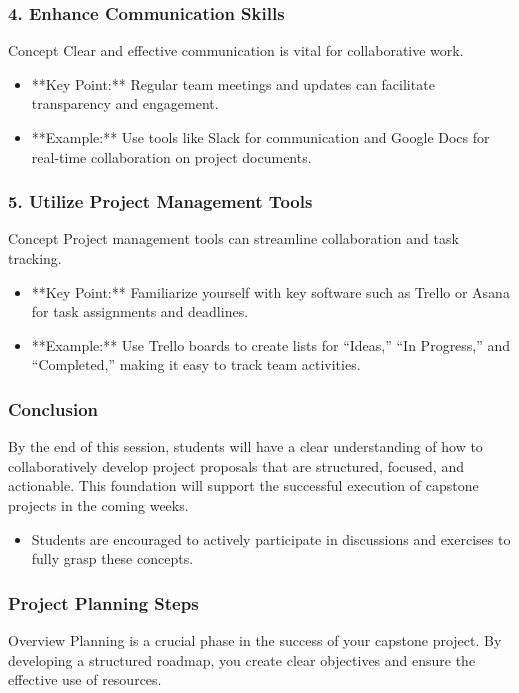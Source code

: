 \documentclass[aspectratio=169]{beamer}
\begin{document}
\begin{frame}[fragile]
    \frametitle{4. Enhance Communication Skills}
    \begin{block}{Concept}
        Clear and effective communication is vital for collaborative work.
    \end{block}
    \begin{itemize}
        \item **Key Point:** Regular team meetings and updates can facilitate transparency and engagement.
        \item **Example:** Use tools like Slack for communication and Google Docs for real-time collaboration on project documents.
    \end{itemize}
\end{frame}

\begin{frame}[fragile]
    \frametitle{5. Utilize Project Management Tools}
    \begin{block}{Concept}
        Project management tools can streamline collaboration and task tracking.
    \end{block}
    \begin{itemize}
        \item **Key Point:** Familiarize yourself with key software such as Trello or Asana for task assignments and deadlines.
        \item **Example:** Use Trello boards to create lists for “Ideas,” “In Progress,” and “Completed,” making it easy to track team activities.
    \end{itemize}
\end{frame}

\begin{frame}[fragile]
    \frametitle{Conclusion}
    By the end of this session, students will have a clear understanding of how to collaboratively develop project proposals that are structured, focused, and actionable. This foundation will support the successful execution of capstone projects in the coming weeks. 
    \begin{itemize}
        \item Students are encouraged to actively participate in discussions and exercises to fully grasp these concepts.
    \end{itemize}
\end{frame}

\begin{frame}[fragile]
    \frametitle{Project Planning Steps}
    \begin{block}{Overview}
        Planning is a crucial phase in the success of your capstone project. By developing a structured roadmap, you create clear objectives and ensure the effective use of resources.
    \end{block}
\end{frame}
\end{document}
